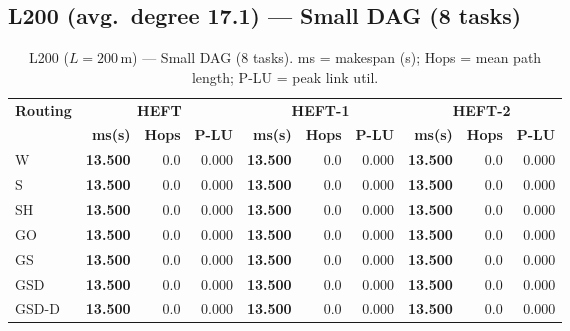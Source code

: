 \documentclass[11pt]{article}
\newcommand{\win}[1]{\textcolor{green!50!black}{\textbf{#1}}}
\begin{document}
\subsection{L200 (avg.\ degree 17.1) --- Small DAG (8 tasks)}
\begin{table}[H]
\centering\small
\begin{tabular}{l r r r r r r r r r}
\toprule
\textbf{Routing} & \multicolumn{3}{c}{\textbf{HEFT}} & \multicolumn{3}{c}{\textbf{HEFT-1}} & \multicolumn{3}{c}{\textbf{HEFT-2}} \\
\cmidrule(lr){2-4}\cmidrule(lr){5-7}\cmidrule(lr){8-10}
& \textbf{ms(s)} & \textbf{Hops} & \textbf{P-LU} & \textbf{ms(s)} & \textbf{Hops} & \textbf{P-LU} & \textbf{ms(s)} & \textbf{Hops} & \textbf{P-LU} \\
\midrule
  W & \win{13.500} & 0.0 & 0.000 & \win{13.500} & 0.0 & 0.000 & \win{13.500} & 0.0 & 0.000 \\
  S & \win{13.500} & 0.0 & 0.000 & \win{13.500} & 0.0 & 0.000 & \win{13.500} & 0.0 & 0.000 \\
  SH & \win{13.500} & 0.0 & 0.000 & \win{13.500} & 0.0 & 0.000 & \win{13.500} & 0.0 & 0.000 \\
  GO & \win{13.500} & 0.0 & 0.000 & \win{13.500} & 0.0 & 0.000 & \win{13.500} & 0.0 & 0.000 \\
  GS & \win{13.500} & 0.0 & 0.000 & \win{13.500} & 0.0 & 0.000 & \win{13.500} & 0.0 & 0.000 \\
  GSD & \win{13.500} & 0.0 & 0.000 & \win{13.500} & 0.0 & 0.000 & \win{13.500} & 0.0 & 0.000 \\
  GSD-D & \win{13.500} & 0.0 & 0.000 & \win{13.500} & 0.0 & 0.000 & \win{13.500} & 0.0 & 0.000 \\
\bottomrule
\end{tabular}
\caption{L200 ($L=200$\,m) --- Small DAG (8 tasks). ms = makespan (s); Hops = mean path length; P-LU = peak link util.}
\end{table}
\end{document}
